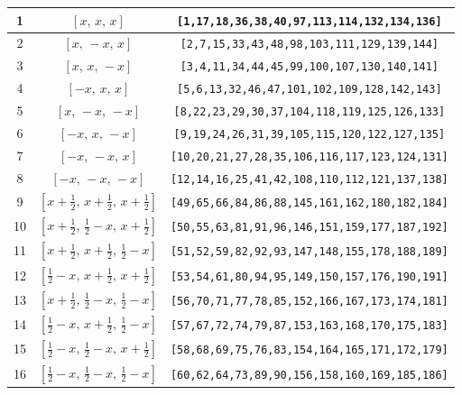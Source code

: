 \documentclass[fleqn,8pt]{jsarticle}
\begin{document}
\begin{longtable}{ccc}
1 & $\left[ x,\, x,\, x \right]$ & {\tt [1,17,18,36,38,40,97,113,114,132,134,136]} \\ \hline
2 & $\left[ x,\, - x,\, x \right]$ & {\tt [2,7,15,33,43,48,98,103,111,129,139,144]} \\ \hline
3 & $\left[ x,\, x,\, - x \right]$ & {\tt [3,4,11,34,44,45,99,100,107,130,140,141]} \\ \hline
4 & $\left[ - x,\, x,\, x \right]$ & {\tt [5,6,13,32,46,47,101,102,109,128,142,143]} \\ \hline
5 & $\left[ x,\, - x,\, - x \right]$ & {\tt [8,22,23,29,30,37,104,118,119,125,126,133]} \\ \hline
6 & $\left[ - x,\, x,\, - x \right]$ & {\tt [9,19,24,26,31,39,105,115,120,122,127,135]} \\ \hline
7 & $\left[ - x,\, - x,\, x \right]$ & {\tt [10,20,21,27,28,35,106,116,117,123,124,131]} \\ \hline
8 & $\left[ - x,\, - x,\, - x \right]$ & {\tt [12,14,16,25,41,42,108,110,112,121,137,138]} \\ \hline
9 & $\left[ x + \frac{1}{2},\, x + \frac{1}{2},\, x + \frac{1}{2} \right]$ & {\tt [49,65,66,84,86,88,145,161,162,180,182,184]} \\ \hline
10 & $\left[ x + \frac{1}{2},\, \frac{1}{2} - x,\, x + \frac{1}{2} \right]$ & {\tt [50,55,63,81,91,96,146,151,159,177,187,192]} \\ \hline
11 & $\left[ x + \frac{1}{2},\, x + \frac{1}{2},\, \frac{1}{2} - x \right]$ & {\tt [51,52,59,82,92,93,147,148,155,178,188,189]} \\ \hline
12 & $\left[ \frac{1}{2} - x,\, x + \frac{1}{2},\, x + \frac{1}{2} \right]$ & {\tt [53,54,61,80,94,95,149,150,157,176,190,191]} \\ \hline
13 & $\left[ x + \frac{1}{2},\, \frac{1}{2} - x,\, \frac{1}{2} - x \right]$ & {\tt [56,70,71,77,78,85,152,166,167,173,174,181]} \\ \hline
14 & $\left[ \frac{1}{2} - x,\, x + \frac{1}{2},\, \frac{1}{2} - x \right]$ & {\tt [57,67,72,74,79,87,153,163,168,170,175,183]} \\ \hline
15 & $\left[ \frac{1}{2} - x,\, \frac{1}{2} - x,\, x + \frac{1}{2} \right]$ & {\tt [58,68,69,75,76,83,154,164,165,171,172,179]} \\ \hline
16 & $\left[ \frac{1}{2} - x,\, \frac{1}{2} - x,\, \frac{1}{2} - x \right]$ & {\tt [60,62,64,73,89,90,156,158,160,169,185,186]} \\
\end{longtable}
\renewcommand{\arraystretch}{1.2}
\end{document}
